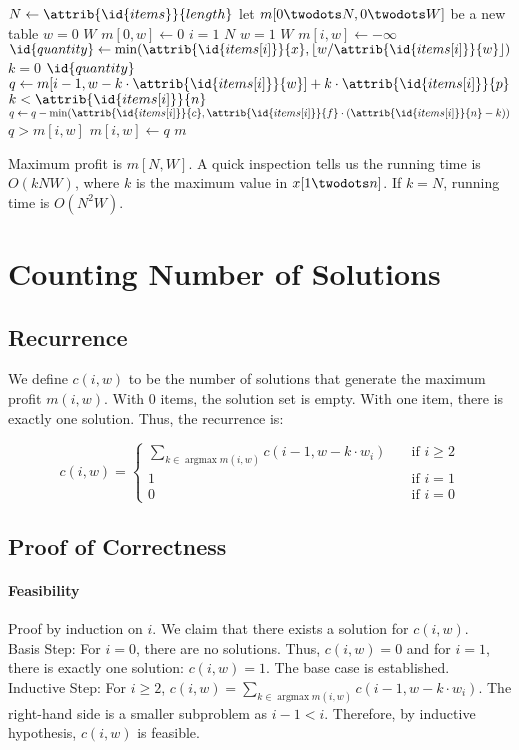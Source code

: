 \documentclass{article}
\newcommand{\floor}[1]{\left\lfloor #1 \right\rfloor}
\newcommand{\itemattr}[1]{\attrib{\id{items[i]}}{#1}}
\DeclareMathOperator*{\argmax}{argmax}
\begin{document}
\begin{codebox}
\li $N \gets \attrib{\id{items}}{length}$
\li let $m[0 \twodots N, 0 \twodots W]$ be a new table
\li \For $w = 0$ \To $W$ \Do
\li 	$m[0, w] \gets 0$
	\End
\li \For $i = 1$ \To $N$ \Do
\li 	\For $w = 1$ \To $W$ \Do
\li 		$m[i, w] \gets -\infty$
\li 		$\id{quantity} \gets \min(\itemattr{x}, \floor{w/\itemattr{w}})$
\li			\For $k = 0$ \To $\id{quantity}$ \Do
\li 			$q \gets m[i-1, w-k \cdot \itemattr{w}] + k \cdot \itemattr{p}$
\li 			\If $k < \itemattr{n}$ \Then
\li 				$q \gets q - \min(\itemattr{c}, \itemattr{f} \cdot (\itemattr{n} - k))$
				\End
\li 			\If $q > m[i, w]$ \Then
\li 				$m[i, w] \gets q$
				\End
			\End		
		\End
	\End
\li \Return $m$
\end{codebox}

Maximum profit is $m[N, W]$. A quick inspection tells us the running time is $O(kNW)$, where $k$ is the maximum value in $x[1 \twodots n]$. If $k=N$, running time is $O(N^2W)$.

\section{Counting Number of Solutions}

\subsection{Recurrence}
We define $c(i, w)$ to be the number of solutions that generate the maximum profit $m(i, w)$. With 0 items, the solution set is empty. With one item, there is exactly one solution. Thus, the recurrence is:

\[ c(i, w) =
\begin{cases}
\sum_{k \in \argmax{m(i, w)}} c(i-1, w-k \cdot w_i) & \quad \text{if } i \geq 2\\
1 & \quad \text{if } i = 1\\
0 & \quad \text{if } i = 0
\end{cases}
\]

\subsection{Proof of Correctness}

\paragraph{Feasibility}
Proof by induction on $i$. We claim that there exists a solution for $c(i, w)$.\\
Basis Step: For $i=0$, there are no solutions. Thus, $c(i, w) = 0$ and for $i=1$, there is exactly one solution: $c(i, w) = 1$. The base case is established.\\
Inductive Step: For $i \geq 2$, $c(i, w) = \sum_{k \in \argmax{m(i, w)}} c(i-1, w-k \cdot w_i)$. The right-hand side is a smaller subproblem as $i-1 < i$. Therefore, by inductive hypothesis, $c(i, w)$ is feasible.
\end{document}
